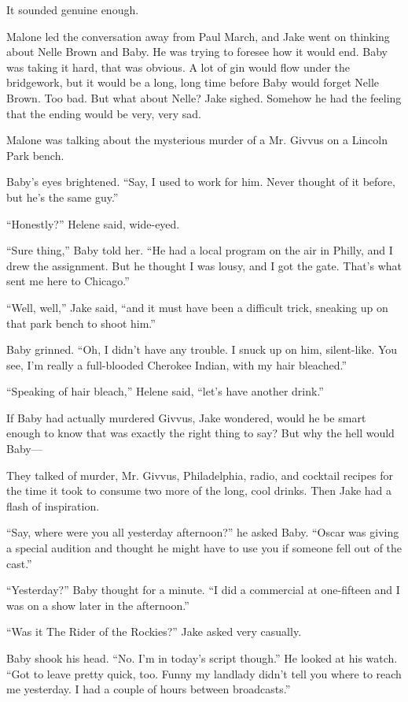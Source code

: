 \documentclass{novel}
\begin{document}
It sounded genuine enough.

Malone led the conversation away from Paul March, and Jake went on thinking about Nelle Brown and Baby. He was trying to foresee how it would end. Baby was taking it hard, that was obvious. A lot of gin would flow under the bridgework, but it would be a long, long time before Baby would forget Nelle Brown. Too bad. But what about Nelle? Jake sighed. Somehow he had the feeling that the ending would be very, very sad.

Malone was talking about the mysterious murder of a Mr. Givvus on a Lincoln Park bench.

Baby’s eyes brightened. “Say, I used to work for him. Never thought of it before, but he’s the same guy.”

“Honestly?” Helene said, wide-eyed.

“Sure thing,” Baby told her. “He had a local program on the air in Philly, and I drew the assignment. But he thought I was lousy, and I got the gate. That’s what sent me here to Chicago.”

“Well, well,” Jake said, “and it must have been a difficult trick, sneaking up on that park bench to shoot him.”

Baby grinned. “Oh, I didn’t have any trouble. I snuck up on him, silent-like. You see, I’m really a full-blooded Cherokee Indian, with my hair bleached.”

“Speaking of hair bleach,” Helene said, “let’s have another drink.”

If Baby had actually murdered Givvus, Jake wondered, would he be smart enough to know that was exactly the right thing to say? But why the hell would Baby—

They talked of murder, Mr. Givvus, Philadelphia, radio, and cocktail recipes for the time it took to consume two more of the long, cool drinks. Then Jake had a flash of inspiration.

“Say, where were you all yesterday afternoon?” he asked Baby. “Oscar was giving a special audition and thought he might have to use you if someone fell out of the cast.”

“Yesterday?” Baby thought for a minute. “I did a commercial at one-fifteen and I was on a show later in the afternoon.”

“Was it The Rider of the Rockies?” Jake asked very casually.

Baby shook his head. “No. I’m in today’s script though.” He looked at his watch. “Got to leave pretty quick, too. Funny my landlady didn’t tell you where to reach me yesterday. I had a couple of hours between broadcasts.”
\end{document}
